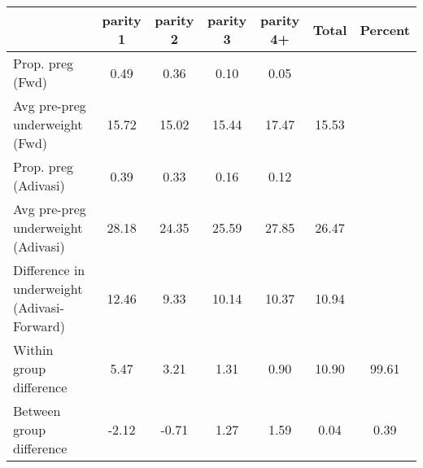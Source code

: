 \begin{tabular}{l*{6}{c}}
\toprule
            &\multicolumn{1}{c}{parity 1}&\multicolumn{1}{c}{parity 2}&\multicolumn{1}{c}{parity 3}&\multicolumn{1}{c}{parity 4+}&\multicolumn{1}{c}{Total}&\multicolumn{1}{c}{Percent}\\
\midrule
\midrule
Prop. preg (Fwd)&        0.49&        0.36&        0.10&        0.05&            &            \\
Avg pre-preg underweight (Fwd)&       15.72&       15.02&       15.44&       17.47&       15.53&            \\
Prop. preg (Adivasi)&        0.39&        0.33&        0.16&        0.12&            &            \\
Avg pre-preg underweight (Adivasi)&       28.18&       24.35&       25.59&       27.85&       26.47&            \\
Difference in underweight (Adivasi-Forward)&       12.46&        9.33&       10.14&       10.37&       10.94&            \\
Within group difference&        5.47&        3.21&        1.31&        0.90&       10.90&       99.61\\
Between group difference&       -2.12&       -0.71&        1.27&        1.59&        0.04&        0.39\\
\bottomrule
\end{tabular}
